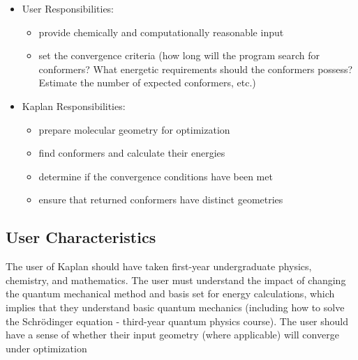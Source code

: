 \documentclass[12pt]{article}
\newcommand{\progname}{Kaplan} %
\begin{document}
\begin{itemize}
\item User Responsibilities:
\begin{itemize}
\item provide chemically and computationally reasonable input

\item set the convergence criteria (how long will the program search for 
conformers? What energetic requirements should the 
conformers possess? Estimate 
the number of expected conformers, etc.)
\end{itemize}
\item \progname{} Responsibilities:
\begin{itemize}
\item prepare molecular geometry for optimization
\item find conformers and calculate their energies
\item determine if the convergence conditions have been met
\item ensure that returned conformers have distinct geometries 
\end{itemize}
\end{itemize}

\subsection{User Characteristics} \label{SecUserCharacteristics}

The user of \progname{} should have taken first-year undergraduate physics, 
chemistry, and mathematics. The user must understand the 
impact of changing the quantum mechanical method and basis set for energy 
calculations, which implies that they understand basic quantum mechanics 
(including how to solve the Schr\"{o}dinger equation - third-year quantum 
physics 
course). The user should have a sense of whether their input geometry (where 
applicable) will converge under optimization
\end{document}
